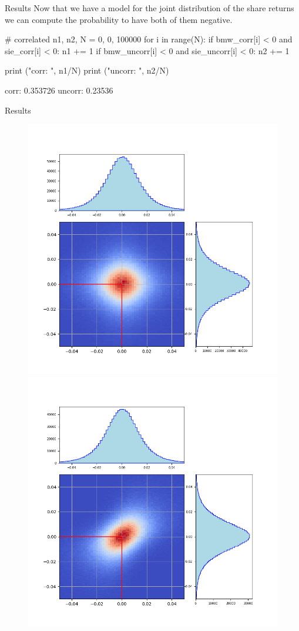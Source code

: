 \documentclass{beamer}
\begin{document}
\begin{frame}[fragile]{Results}
  Now that we have a model for the joint distribution of the share returns we can compute the probability to have both of them negative.
  \begin{ipython}
# correlated
n1, n2, N = 0, 0, 100000 
for i in range(N):
  if bmw_corr[i] < 0 and sie_corr[i] < 0:
    n1 += 1
  if bmw_uncorr[i] < 0 and sie_uncorr[i] < 0:
    n2 += 1

print ("corr: ", n1/N)
print ("uncorr: ", n2/N)
\end{ipython}
\begin{ioutput}
corr: 0.353726
uncorr: 0.23536
\end{ioutput}
\end{frame}

\begin{frame}[fragile]{Results}
  \begin{figure}[h]
    \begin{center}
      \includegraphics[width=0.45\linewidth]{bmw_siemens_corr} \quad
      \includegraphics[width=0.45\linewidth]{bmw_siemens_uncorr}
    \end{center}
  \end{figure}
\end{frame}
\end{document}
